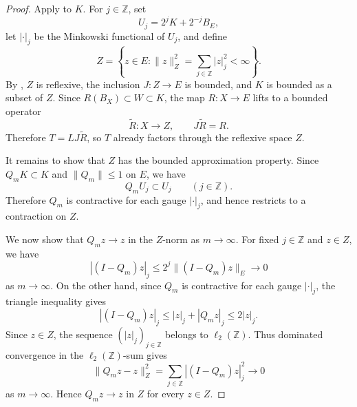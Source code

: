 \documentclass[11pt,reqno]{amsart}
\makeatletter
\theoremstyle{plain}
\theoremstyle{definition}
\newcounter{problempaper}
\newenvironment{problempaperbody}{%
  \setcounter{subsection}{0}%
  \setcounter{subsubsection}{0}%
  \setcounter{paragraph}{0}%
  \renewcommand{\thesubsection}{\arabic{subsection}}%
  \renewcommand{\thesubsubsection}{\thesubsection.\arabic{subsubsection}}%
  \renewcommand{\theparagraph}{\thesubsubsection.\arabic{paragraph}}%
  \let\problem@outersection\section
  \let\problem@outersubsection\subsection
  \let\problem@outersubsubsection\subsubsection
  \let\problem@outerparagraph\paragraph
  \let\section\problem@papersection
  \let\subsection\problem@papersubsection
  \let\subsubsection\problem@papersubsubsection
}{%
  \let\section\problem@outersection
  \let\subsection\problem@outersubsection
  \let\subsubsection\problem@outersubsubsection
  \let\paragraph\problem@outerparagraph
}
\newcommand{\problem@target}[2]{%
  \hypertarget{problem-\theproblempaper-#1-#2}{}%
}
\newcommand{\problem@paperheading}[3]{%
  \par\bigskip
  \problem@target{#1}{#2}%
  \noindent{\large\bfseries #2.\quad #3\par}%
  \nobreak\smallskip
}
\newcommand{\problem@papersubheading}[3]{%
  \par\medskip
  \problem@target{#1}{#2}%
  \noindent{\normalsize\bfseries #2.\quad #3\par}%
  \nobreak\smallskip
}
\newcommand{\problem@papersubsubheading}[3]{%
  \par\smallskip
  \problem@target{#1}{#2}%
  \noindent{\normalsize\itshape #2.\quad #3.\ }%
}
\def\problem@papersection{%
  \@ifstar{\problem@papersectionstar}{\problem@papersectionnostar}%
}
\def\problem@papersectionstar#1{%
  \par\bigskip\noindent{\large\bfseries #1\par}\nobreak\smallskip
}
\def\problem@papersectionnostar#1{%
  \refstepcounter{subsection}%
  \setcounter{subsubsection}{0}%
  \setcounter{paragraph}{0}%
  \problem@paperheading{section}{\thesubsection}{#1}%
  \problem@writecontentsline{section}{\thesubsection}{#1}%
}
\def\problem@papersubsection{%
  \@ifstar{\problem@papersubsectionstar}{\problem@papersubsectionnostar}%
}
\def\problem@papersubsectionstar#1{%
  \par\medskip\noindent{\normalsize\bfseries #1\par}\nobreak\smallskip
}
\def\problem@papersubsectionnostar#1{%
  \refstepcounter{subsubsection}%
  \setcounter{paragraph}{0}%
  \problem@papersubheading{subsection}{\thesubsubsection}{#1}%
  \problem@writecontentsline{subsection}{\thesubsubsection}{#1}%
}
\def\problem@papersubsubsection{%
  \@ifstar{\problem@papersubsubsectionstar}{\problem@papersubsubsectionnostar}%
}
\def\problem@papersubsubsectionstar#1{%
  \par\smallskip\noindent{\normalsize\itshape #1.\ }%
}
\def\problem@papersubsubsectionnostar#1{%
  \refstepcounter{paragraph}%
  \problem@papersubsubheading{subsubsection}{\theparagraph}{#1}%
  \problem@writecontentsline{subsubsection}{\theparagraph}{#1}%
}
\newcommand{\problem@writecontentsline}[3]{%
  \begingroup
  \protected@write\@auxout{}{%
    \string\problemcontentsentry{\theproblempaper}{#1}{#2}{#3}{\thepage}%
  }%
  \endgroup
}
\newcommand{\problemcontentsentry}[5]{%
  \@ifundefined{problemcontents@#1}{%
    \expandafter\gdef\csname problemcontents@#1\endcsname{}%
  }{}%
  \expandafter\g@addto@macro\csname problemcontents@#1\endcsname{%
    \problemcontentsline{#1}{#2}{#3}{#4}{#5}%
  }%
}
\newcommand{\problemcontentslink}[4]{%
  \hyperlink{problem-#1-#2-#3}{#4}%
}
\newcommand{\problemcontentsline}[5]{%
  \ifstrequal{#2}{section}{%
    \par\noindent
    \problemcontentslink{#1}{#2}{#3}{\makebox[2.5em][l]{#3}#4}%
    \nobreak\dotfill
    \problemcontentslink{#1}{#2}{#3}{#5}\par
  }{%
    \ifstrequal{#2}{subsection}{%
      \par\noindent\hspace*{1.5em}%
      \problemcontentslink{#1}{#2}{#3}{\makebox[3.5em][l]{#3}#4}%
      \nobreak\dotfill
      \problemcontentslink{#1}{#2}{#3}{#5}\par
    }{%
      \par\noindent\hspace*{3em}%
      \problemcontentslink{#1}{#2}{#3}{\makebox[4.5em][l]{#3}#4}%
      \nobreak\dotfill
      \problemcontentslink{#1}{#2}{#3}{#5}\par
    }%
  }%
}
\makeatother
\begin{document}
\begin{problempaperbody}
\begin{proof}
Apply  to $K$. For $j\in\mathbb Z$, set
\begin{equation*}
        U_j=2^jK+2^{-j}B_E,
\end{equation*}
let $|\cdot|_j$ be the Minkowski functional of $U_j$, and define
\begin{equation*}
        Z=\left\{z\in E\colon \|z\|_Z^2=\sum_{j\in\mathbb Z}|z|_j^2<\infty\right\}.
\end{equation*}
By , $Z$ is reflexive, the inclusion $J\colon Z\to E$ is bounded, and $K$ is bounded as a subset of $Z$. Since $R(B_X)\subset W\subset K$, the map $R\colon X\to E$ lifts to a bounded operator
\begin{equation*}
        \widetilde R\colon X\to Z,\qquad J\widetilde R=R .
\end{equation*}
Therefore $T=LJ\widetilde R$, so $T$ already factors through the reflexive space $Z$.

It remains to show that $Z$ has the bounded approximation property. Since $Q_mK\subset K$ and $\|Q_m\|\leq1$ on $E$, we have
\begin{equation*}
        Q_mU_j\subset U_j \qquad (j\in\mathbb Z).
\end{equation*}
Therefore $Q_m$ is contractive for each gauge $|\cdot|_j$, and hence restricts to a contraction on $Z$.

We now show that $Q_mz\to z$ in the $Z$-norm as $m\to\infty$. For fixed $j\in\mathbb Z$ and $z\in Z$, we have
\begin{equation*}
        |(I-Q_m)z|_j\leq 2^j\|(I-Q_m)z\|_E\to0
\end{equation*}
as $m\to\infty$. On the other hand, since $Q_m$ is contractive for each gauge $|\cdot|_j$, the triangle inequality gives
\begin{equation*}
        |(I-Q_m)z|_j\leq |z|_j+|Q_mz|_j\leq2|z|_j.
\end{equation*}
Since $z\in Z$, the sequence $(|z|_j)_{j\in\mathbb Z}$ belongs to $\ell_2(\mathbb Z)$. Thus dominated convergence in the $\ell_2(\mathbb Z)$-sum gives
\begin{equation*}
        \|Q_mz-z\|_Z^2=\sum_{j\in\mathbb Z}|(I-Q_m)z|_j^2\to0
\end{equation*}
as $m\to\infty$. Hence $Q_mz\to z$ in $Z$ for every $z\in Z$.


\end{proof}
\end{problempaperbody}
\end{document}
